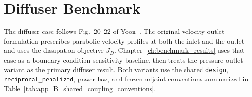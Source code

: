 \FloatBarrier

\section{Diffuser Benchmark}
\label{sec:app_B_config_yoon_diffuser}

The diffuser case follows Fig.~20--22 of Yoon~\cite{Yoon2016}. The original velocity-outlet formulation prescribes parabolic velocity profiles at both the inlet and the outlet and uses the dissipation objective $J_D$. Chapter~\ref{ch:benchmark_results} uses that case as a boundary-condition sensitivity baseline, then treats the pressure-outlet variant as the primary diffuser result. Both variants use the shared \texttt{design}, \texttt{reciprocal\_penalized}, power-law, and frozen-adjoint conventions summarized in Table~\ref{tab:app_B_shared_coupling_conventions}.

